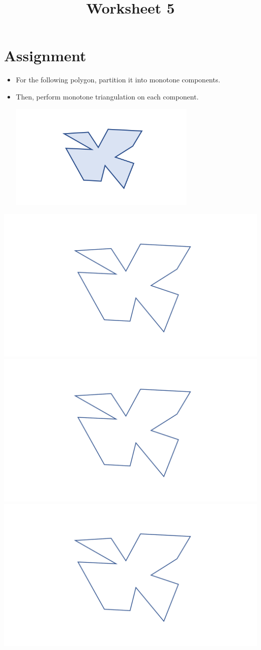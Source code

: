 \documentclass[a4paper,12pt]{article}
\title{Worksheet 5}
\begin{document}
\maketitle

\worksheetGroundRules


\vspace{5pt}
\section{Assignment}

\begin{itemize}


\item For the following polygon, partition it into monotone components. 
\item Then, perform monotone triangulation on each component. 

\begin{center}
\includegraphics[width=9cm]{../images/worksheet3.pdf}
\end{center}


\end{itemize}

\worksheetSubmission


\newpage

\includegraphics[width=0.3\linewidth]{../images/worksheet3_no_color.pdf}\hfill
\includegraphics[width=0.3\linewidth]{../images/worksheet3_no_color.pdf}\hfill
\includegraphics[width=0.3\linewidth]{../images/worksheet3_no_color.pdf}
\end{document}
